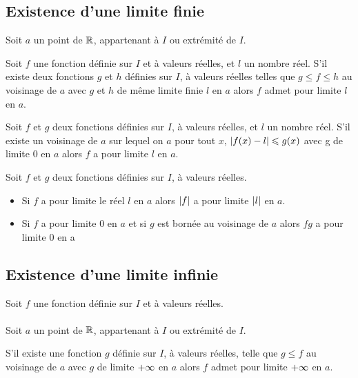 \subsection{Existence d’une limite finie}
Soit \(a\) un point de \(\mathbb{R}\), appartenant à \(I\) ou extrémité de \(I\).
\begin{theo}
    Soit \(f\) une fonction définie sur \(I\) et à valeurs réelles, et \(l\) un nombre réel. S’il existe deux fonctions \(g\) et \(h\) définies sur \(I\), à valeurs réelles telles que \(g \leq f \leq h\) au voisinage de \(a\) avec \(g\) et \(h\) de même limite finie \(l\) en \(a\) alors \(f\) admet pour limite \(l\) en \(a\).
\end{theo}

\begin{defprop}
    Soit \(f\) et \(g\) deux fonctions définies sur \(I\), à valeurs réelles, et \(l\) un nombre réel. S’il existe un voisinage de \(a\) sur lequel on \(a\) pour tout \(x\), \(\left\lvert f(x)-l\right\rvert\leqslant g(x)\) avec g de limite \(0\) en \(a\) alors \(f\) a pour limite \(l\) en \(a\).
\end{defprop}

\begin{defprop}
Soit \(f\) et \(g\) deux fonctions définies sur \(I\), à valeurs réelles.
    \begin{itemize}
        \item Si \(f\) a pour limite le réel \(l\) en \(a\) alors \(\left\lvert f\right\rvert\) a pour limite \(\left\lvert l\right\rvert\) en \(a\).
        \item Si \(f\) a pour limite \(0\) en \(a\) et si \(g\) est bornée au voisinage de \(a\) alors \(f g\) a pour limite \(0\) en a
    \end{itemize}
\end{defprop}

\subsection{Existence d’une limite infinie}
Soit \(f\) une fonction définie sur \(I\) et à valeurs réelles.\\~\\
Soit \(a\) un point de \(\mathbb{R}\), appartenant à \(I\) ou extrémité de \(I\).

\begin{theo}
    S’il existe une fonction \(g\) définie sur \(I\), à valeurs réelles, telle que \(g \leq f\) au voisinage de \(a\) avec \(g\) de limite \(+\infty\) en \(a\) alors \(f\) admet pour limite \(+\infty\) en \(a\).
\end{theo} 

